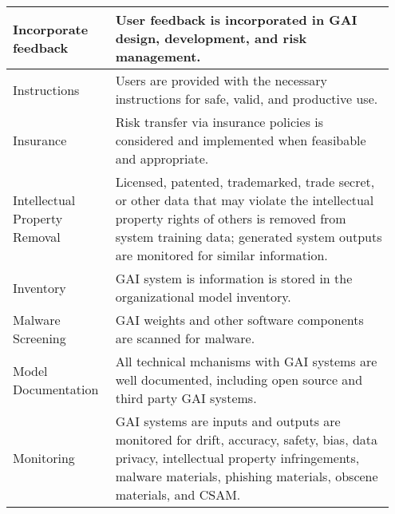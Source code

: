 \documentclass[fleqn]{article}
\begin{document}
\begin{table}[H]
\begin{tabular}{|m{0.25\linewidth} |m{0.70\linewidth} |}
		Incorporate feedback & User feedback is incorporated in GAI design, development, and risk management. \\ \hline
		Instructions & Users are provided with the necessary instructions for safe, valid, and productive use. \\ \hline
		Insurance & Risk transfer via insurance policies is considered and implemented when feasibable and appropriate.  \\ \hline
		Intellectual Property Removal & Licensed, patented, trademarked, trade secret, or other data that may violate the intellectual property rights of others is removed from system training data; generated system outputs are monitored for similar information.  \\ \hline
		Inventory & GAI system is information is stored in the organizational model inventory.  \\ \hline
		Malware Screening & GAI weights and other software components are scanned for malware.  \\ \hline
		Model Documentation  & All technical mchanisms with GAI systems are well documented, including open source and third party GAI systems.  \\ \hline
		Monitoring & GAI systems are inputs and outputs are monitored for drift, accuracy, safety, bias, data privacy, intellectual property infringements, malware materials, phishing materials, obscene materials, and CSAM.  \\ \hline
		
	\end{tabular}
\end{table}	
\pagebreak		
	
\end{document}
